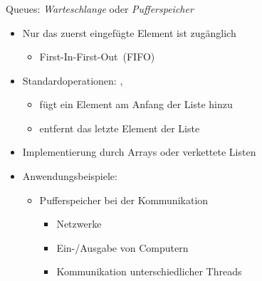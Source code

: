 \begin{frame}
\frametitle{\insertsection}
\begin{block}
{Queues: \emph{Warteschlange} oder \emph{Pufferspeicher}}
\begin{itemize}
	\item Nur das zuerst eingefügte Element ist zugänglich
	\begin{itemize}
		\item \glqq First-In-First-Out\grqq\ (FIFO)
	\end{itemize}
	\item<2-> Standardoperationen: , 
	\begin{itemize}
		\item {} fügt ein Element am Anfang der Liste hinzu
		\item {} entfernt das letzte Element der Liste
	\end{itemize}
	\item<3-> Implementierung durch Arrays oder verkettete Listen
	\item<4-> Anwendungsbeispiele:
	\begin{itemize}
		\item Pufferspeicher bei der Kommunikation
		\begin{itemize}
			\item Netzwerke
			\item Ein-/Ausgabe von Computern
			\item Kommunikation unterschiedlicher Threads
		\end{itemize}
	\end{itemize}
\end{itemize}
\end{block}
\end{frame}